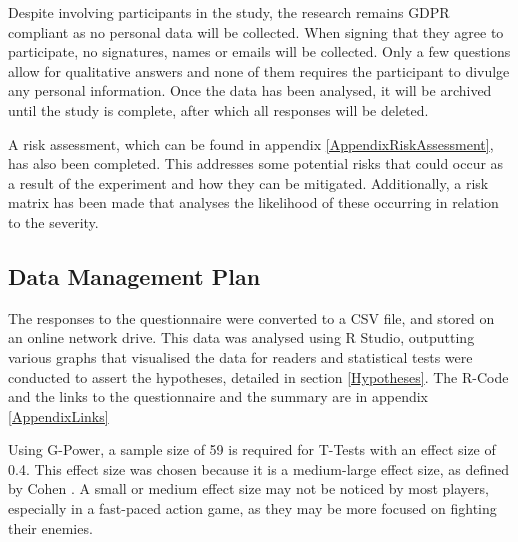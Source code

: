\documentclass{IEEEtran}
\begin{document}

Despite involving participants in the study, the research remains GDPR compliant as no personal data will be collected. When signing that they agree to participate, no signatures, names or emails will be collected. Only a few questions allow for qualitative answers and none of them requires the participant to divulge any personal information. Once the data has been analysed, it will be archived until the study is complete, after which all responses will be deleted.

A risk assessment, which can be found in appendix \ref{AppendixRiskAssessment}, has also been completed. This addresses some potential risks that could occur as a result of the experiment and how they can be mitigated. Additionally, a risk matrix has been made that analyses the likelihood of these occurring in relation to the severity.

\subsection{Data Management Plan}
\label{DataManagement}


The responses to the questionnaire were converted to a CSV file, and stored on an online network drive. This data was analysed using R Studio, outputting various graphs that visualised the data for readers and statistical tests were conducted to assert the hypotheses, detailed in section \ref{Hypotheses}. The R-Code and the links to the questionnaire and the summary are in appendix \ref{AppendixLinks}

Using G-Power, a sample size of 59 is required for T-Tests with an effect size of 0.4. This effect size was chosen because it is a medium-large effect size, as defined by Cohen \cite{cohen1988statistical}. A small or medium effect size may not be noticed by most players, especially in a fast-paced action game, as they may be more focused on fighting their enemies.

    
\end{document}
